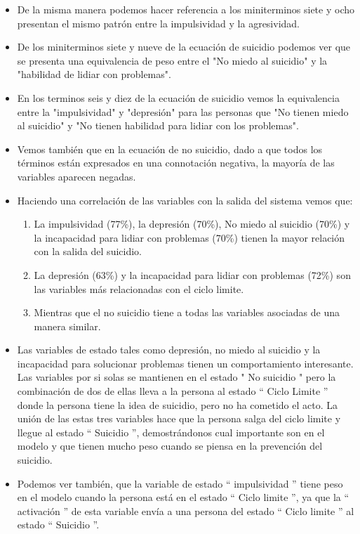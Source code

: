 {{{{{\begin{itemize}
${ (x }_{ 1 }\wedge { x }_{ 2 }\wedge { \neg x }_{ 3 }\wedge { x }_{ 7 })\vee { (x }_{ 1 }\wedge { x }_{ 2 }\wedge { \neg x }_{ 3 }\wedge { x }_{ 6 })$
\item De la misma manera podemos hacer referencia a los miniterminos siete y ocho presentan el mismo patrón entre la impulsividad y la agresividad.
\item De los miniterminos siete y nueve de la ecuación de suicidio podemos ver que se presenta una equivalencia de peso entre el "No miedo al suicidio" y la "habilidad de lidiar con problemas".
\item En los terminos seis y diez de la ecuación de suicidio vemos la equivalencia entre la "impulsividad" y "depresión" para las personas que "No tienen miedo al suicidio" y "No tienen habilidad para lidiar con los problemas".
\item Vemos también que en la ecuación de no suicidio, dado a que todos los términos están expresados en una connotación negativa, la mayoría de las variables aparecen negadas.
\item Haciendo una correlación de las variables con la salida del sistema vemos que:
\begin{enumerate}
\item La impulsividad (77\%), la depresión (70\%), No miedo al suicidio (70\%) y la incapacidad para lidiar con problemas (70\%) tienen la mayor relación con la salida del suicidio.
\item La depresión (63\%) y la incapacidad para lidiar con problemas (72\%) son las variables más relacionadas con el ciclo limite.
\item Mientras que el no suicidio tiene a todas las variables asociadas de una manera similar.
\end{enumerate}
\item Las variables de estado tales como depresión, no miedo al suicidio y la incapacidad para solucionar problemas tienen un comportamiento interesante. Las variables por si solas se mantienen en el estado " No suicidio " pero la combinación de dos de ellas lleva a la persona al estado “ Ciclo Limite ” donde la persona tiene la idea de suicidio, pero no ha cometido el acto. La unión de las estas tres variables hace que la persona salga del ciclo limite y llegue al estado “ Suicidio ”, demostrándonos cual importante son en el modelo y que tienen mucho peso cuando se piensa en la prevención del suicidio.
\item Podemos ver también, que la variable de estado “ impulsividad ” tiene peso en el modelo cuando la persona está en el estado “ Ciclo limite ”, ya que la “ activación ” de esta variable envía a una persona del estado “ Ciclo limite ” al estado “ Suicidio ”.

\end{itemize}}}}}}
